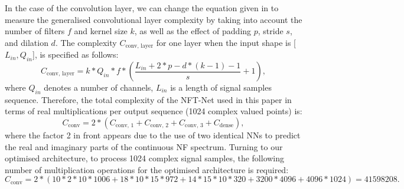In the case of the convolution layer, we can change the equation given in \cite{freire2021performance} to measure the generalised convolutional layer complexity by taking into account the number of filters $f$ and kernel size $k$, as well as the effect of padding $p$, stride $s$, and dilation $d$. The complexity $C_{\text{conv, layer}}$ for one layer when the input shape is [$L_{in},Q_{in}$], is specified as follows:
\begin{equation}
C_{\text{conv, layer}} = k* Q_{in} * f *\left( \frac{L_{in} + 2*p -d*(k-1)-1}{s} +1\right) {,}
\label{eq:c_conv}
\end{equation}
where $Q_{in}$ denotes a number of channels, $L_{in}$ is a length of signal samples sequence.
Therefore, the total complexity of the NFT-Net used in this paper in terms of real multiplications per output sequence (1024 complex valued points) is:
\begin{equation}
C_{\text{conv}} = 2*(C_{\text{conv, 1}}+C_{\text{conv, 2}}+C_{\text{conv, 3}}+C_{\text{dense}}) {,}
\label{eq:c_total}
\end{equation}
where the factor 2 in front appears due to the use of two identical NNs to predict the real and imaginary parts of the continuous NF spectrum. Turning to our optimised architecture, to process  1024 complex signal samples, the following number of multiplication operations for the optimised architecture is required:
\begin{equation}
C_{\text{conv}} = 2*(10*2*10*1006+ 18* 10*15 * 972 + 14*15*10*320 + 3200*4096 +4096*1024) = 41598208 {.}
\label{eq:c_total_num}
\end{equation}
